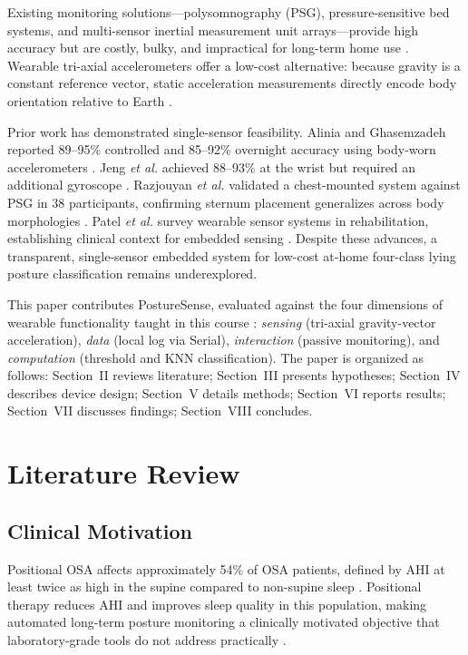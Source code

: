 \documentclass[journal]{IEEEtran}
\begin{document}
Existing monitoring solutions---polysomnography (PSG), pressure-sensitive
bed systems, and multi-sensor inertial measurement unit arrays---provide
high accuracy but are costly, bulky, and impractical for long-term home use
\cite{alinia2020}. Wearable tri-axial accelerometers offer a low-cost
alternative: because gravity is a constant reference vector, static
acceleration measurements directly encode body orientation relative to
Earth \cite{razjouyan2017}.

Prior work has demonstrated single-sensor feasibility. Alinia and
Ghasemzadeh reported 89--95\% controlled and 85--92\% overnight accuracy
using body-worn accelerometers \cite{alinia2020}. Jeng \textit{et al.}
achieved 88--93\% at the wrist but required an additional gyroscope
\cite{jeng2021}. Razjouyan \textit{et al.} validated a chest-mounted system
against PSG in 38 participants, confirming sternum placement generalizes
across body morphologies \cite{razjouyan2017}. Patel \textit{et al.} survey
wearable sensor systems in rehabilitation, establishing clinical context for
embedded sensing \cite{patel2012}. Despite these advances, a transparent,
single-sensor embedded system for low-cost at-home four-class lying posture
classification remains underexplored.

This paper contributes PostureSense, evaluated against the four dimensions
of wearable functionality taught in this course :
\textit{sensing} (tri-axial gravity-vector acceleration), \textit{data}
(local log via Serial), \textit{interaction} (passive monitoring), and
\textit{computation} (threshold and KNN classification). The paper is
organized as follows: Section~II reviews literature; Section~III presents
hypotheses; Section~IV describes device design; Section~V details methods;
Section~VI reports results; Section~VII discusses findings; Section~VIII
concludes.

\section{Literature Review}

\subsection{Clinical Motivation}
Positional OSA affects approximately 54\% of OSA patients, defined by AHI
at least twice as high in the supine compared to non-supine sleep
\cite{skinner2008,mador2005}. Positional therapy reduces AHI and improves
sleep quality in this population, making automated long-term posture
monitoring a clinically motivated objective that laboratory-grade tools do
not address practically \cite{npuap2019}.
\end{document}

